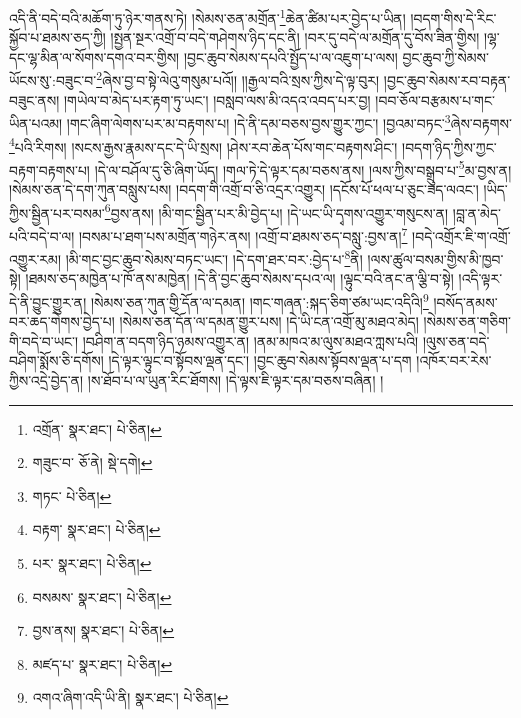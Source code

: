 འདི་ནི་བདེ་བའི་མཆོག་ཏུ་ཉེར་གནས་ཏེ། །སེམས་ཅན་མགྲོན་\footnote{འགྲོན་  སྣར་ཐང་།  པེ་ཅིན། }ཆེན་ཚིམ་པར་བྱེད་པ་ཡིན། །བདག་གིས་དེ་རིང་སྐྱོབ་པ་ཐམས་ཅད་ཀྱི། །སྤྱན་སྔར་འགྲོ་བ་བདེ་གཤེགས་ཉིད་དང་ནི། །བར་དུ་བདེ་ལ་མགྲོན་དུ་བོས་ཟིན་གྱིས། །ལྷ་དང་ལྷ་མིན་ལ་སོགས་དགའ་བར་གྱིས། །བྱང་ཆུབ་སེམས་དཔའི་སྤྱོད་པ་ལ་འཇུག་པ་ལས། བྱང་ཆུབ་ཀྱི་སེམས་ཡོངས་སུ་:བཟུང་བ་\footnote{གཟུང་བ་  ཅོ་ནེ།  སྡེ་དགེ། }ཞེས་བྱ་བ་སྟེ་ལེའུ་གསུམ་པའོ།། །།རྒྱལ་བའི་སྲས་ཀྱིས་དེ་ལྟ་བུར། །བྱང་ཆུབ་སེམས་རབ་བརྟན་བཟུང་ནས། །གཡེལ་བ་མེད་པར་རྟག་ཏུ་ཡང་། །བསླབ་ལས་མི་འདའ་འབད་པར་བྱ། །བབ་ཅོལ་བརྩམས་པ་གང་ཡིན་པའམ། །གང་ཞིག་ལེགས་པར་མ་བརྟགས་པ། །དེ་ནི་དམ་བཅས་བྱས་གྱུར་ཀྱང་། །བྱའམ་བཏང་\footnote{གཏང་  པེ་ཅིན། }ཞེས་བརྟགས་\footnote{བརྟག་  སྣར་ཐང་།  པེ་ཅིན། }པའི་རིགས། །སངས་རྒྱས་རྣམས་དང་དེ་ཡི་སྲས། །ཤེས་རབ་ཆེན་པོས་གང་བརྟགས་ཤིང་། །བདག་ཉིད་ཀྱིས་ཀྱང་བརྟག་བརྟགས་པ། །དེ་ལ་བཤོལ་དུ་ཅི་ཞིག་ཡོད། །གལ་ཏེ་དེ་ལྟར་དམ་བཅས་ནས། །ལས་ཀྱིས་བསྒྲུབ་པ་\footnote{པར་  སྣར་ཐང་།  པེ་ཅིན། }མ་བྱས་ན། །སེམས་ཅན་དེ་དག་ཀུན་བསླུས་པས། །བདག་གི་འགྲོ་བ་ཅི་འདྲར་འགྱུར། །དངོས་པོ་ཕལ་པ་ཅུང་ཟད་ལའང་། །ཡིད་ཀྱིས་སྦྱིན་པར་བསམ་\footnote{བསམས་  སྣར་ཐང་།  པེ་ཅིན། }བྱས་ནས། །མི་གང་སྦྱིན་པར་མི་བྱེད་པ། །དེ་ཡང་ཡི་དྭགས་འགྱུར་གསུངས་ན། །བླ་ན་མེད་པའི་བདེ་བ་ལ། །བསམ་པ་ཐག་པས་མགྲོན་གཉེར་ནས། །འགྲོ་བ་ཐམས་ཅད་བསླུ་:བྱས་ན།\footnote{བྱས་ནས།  སྣར་ཐང་།  པེ་ཅིན། } །བདེ་འགྲོར་ཇི་ག་འགྲོ་འགྱུར་རམ། །མི་གང་བྱང་ཆུབ་སེམས་བཏང་ཡང་། །དེ་དག་ཐར་བར་:བྱེད་པ་\footnote{མཛད་པ་  སྣར་ཐང་།  པེ་ཅིན། }ནི། །ལས་ཚུལ་བསམ་གྱིས་མི་ཁྱབ་སྟེ། །ཐམས་ཅད་མཁྱེན་པ་ཁོ་ནས་མཁྱེན། །དེ་ནི་བྱང་ཆུབ་སེམས་དཔའ་ལ། །ལྟུང་བའི་ནང་ན་ལྕི་བ་སྟེ། །འདི་ལྟར་དེ་ནི་བྱུང་གྱུར་ན། །སེམས་ཅན་ཀུན་གྱི་དོན་ལ་དམན། །གང་གཞན་:སྐད་ཅིག་ཙམ་ཡང་འདིའི།\footnote{འགའ་ཞིག་འདི་ཡི་ནི།  སྣར་ཐང་།  པེ་ཅིན། } །བསོད་ནམས་བར་ཆད་གེགས་བྱེད་པ། །སེམས་ཅན་དོན་ལ་དམན་གྱུར་པས། །དེ་ཡི་ངན་འགྲོ་མུ་མཐའ་མེད། །སེམས་ཅན་གཅིག་གི་བདེ་བ་ཡང་། །བཤིག་ན་བདག་ཉིད་ཉམས་འགྱུར་ན། །ནམ་མཁའ་མ་ལུས་མཐའ་ཀླས་པའི། །ལུས་ཅན་བདེ་བཤིག་སྨོས་ཅི་དགོས། །དེ་ལྟར་ལྟུང་བ་སྟོབས་ལྡན་དང་། །བྱང་ཆུབ་སེམས་སྟོབས་ལྡན་པ་དག །འཁོར་བར་རེས་ཀྱིས་འདྲེ་བྱེད་ན། །ས་ཐོབ་པ་ལ་ཡུན་རིང་ཐོགས། །དེ་ལྟས་ཇི་ལྟར་དམ་བཅས་བཞིན། །
